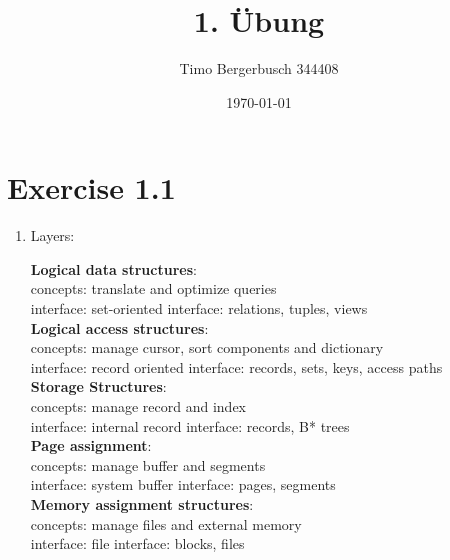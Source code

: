 \documentclass[12pt]{article}
\begin{document}
	
	\title{1. Übung}
	\author{Timo Bergerbusch 344408}
	\date{\specialdate\today}
	\maketitle
	
	
	\section{Exercise 1.1}
			
	
		 \begin{enumerate}
			\item Layers:\\
			\begin{minipage}{.6\textwidth}
					\textbf{Logical data structures}:\\
					concepts: translate and optimize queries\\
					interface: set-oriented interface: relations, tuples, views \\
					
					\textbf{Logical access structures}:\\
					concepts: manage cursor, sort components and dictionary\\
					interface: record oriented interface: records, sets, keys, access paths\\
					
					\textbf{Storage Structures}:\\
					concepts: manage record and index\\
					interface: internal record interface: records, B* trees\\
					
					\textbf{Page assignment}:\\
					concepts: manage buffer and segments\\
					interface: system buffer interface: pages, segments\\
					
					\textbf{Memory assignment structures}:\\
					concepts: manage files and external memory\\
					interface: file interface: blocks, files\\
					

\end{minipage}
\end{enumerate}
\end{document}
